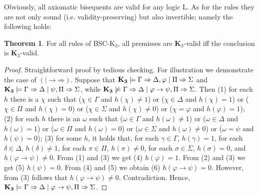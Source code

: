 \documentclass[10pt,a4paper]{article}
\theoremstyle{definition}
\newtheorem{theorem}{\textbf{Theorem}}
\newcommand{\3}{\vspace{.3in}}
\newcommand{\2}{\vspace{.2in}}
\newcommand{\1}{\vspace{.1in}}
\newcommand{\5}{\vspace{.05in}}
\begin{document}
\1

Obviously, all axiomatic bisequents are valid for any logic L. As for the rules they are not only sound (i.e. validity-preserving) but also invertible; namely the following holds:

\begin{theorem}\label{Theorem1}
	For all rules of BSC-K$_3$, all premisses are {\bf K$_3$}-valid iff the conclusion is {\bf K$_3$}-valid.
\end{theorem}
\begin{proof}
Straightforward proof by tedious checking. For illustration we demonstrate the case of $(\mathord{\mid\rightarrow}\mathord{\Rightarrow})$. Suppose that ${\bf K_3}\models\Gamma\Rightarrow\Delta,\varphi \mid \Pi\Rightarrow\Sigma$ and ${\bf K_3}\models\Gamma\Rightarrow\Delta \mid \psi,\Pi\Rightarrow\Sigma$, while ${\bf K_3}\not\models\Gamma\Rightarrow\Delta \mid \varphi\rightarrow\psi,\Pi\Rightarrow\Sigma$. Then (1) for each $ h $ there is a $ \chi $ such that ($ \chi\in\Gamma $ and $ h(\chi)\not=1 $) or ($ \chi\in\Delta $ and $ h(\chi)=1 $) or ($ \chi\in\Pi $ and $ h(\chi)=0$) or ($ \chi\in\Sigma $ and $ h(\chi)\not=0 $) or ($ \chi=\varphi $ and $ h(\varphi)=1 $); (2) for each $ h $ there is an $ \omega $ such that ($ \omega\in\Gamma $ and $ h(\omega)\not=1 $) or ($ \omega\in\Delta $ and $ h(\omega)=1 $) or ($ \omega\in\Pi $ and $ h(\omega)=0$) or ($ \omega\in\Sigma $ and $ h(\omega)\not=0 $) or ($ \omega=\psi $ and $ h(\psi)=0 $); (3) for some $ h $, it holds that, for each $ \gamma\in\Gamma $, $h(\gamma)=1$, for each $ \delta\in\Delta $, $ h(\delta)\not=1 $, for each $ \pi\in\Pi $, $ h(\pi)\not=0 $, for each $ \sigma\in\Sigma $, $ h(\sigma)=0 $, and $ h(\varphi\rightarrow\psi)\not=0 $. From (1) and (3) we get (4) $ h(\varphi)=1 $. From (2) and (3) we get (5) $ h(\psi)=0 $. From (4) and (5) we obtain (6) $ h(\varphi\rightarrow\psi)=0 $. However, from (3) follows that $ h(\varphi\rightarrow\psi)\not=0 $. Contradiction. Hence, ${\bf K_3}\models\Gamma\Rightarrow\Delta \mid \varphi\rightarrow\psi,\Pi\Rightarrow\Sigma$.


\end{proof}
\end{document}
